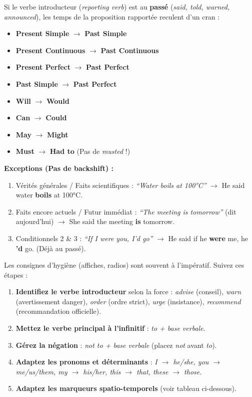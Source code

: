 \documentclass[11pt]{article}
\newcommand{\cle}[1]{{\popxbold\color{popdark}#1}}
\begin{document}
\begin{propriete}
Si le verbe introducteur (\emph{reporting verb}) est au \textbf{passé} (\emph{said, told, warned, announced}), les temps de la proposition rapportée reculent d'un cran :
\begin{itemize}
    \item \textbf{Present Simple} $\rightarrow$ \textbf{Past Simple}
    \item \textbf{Present Continuous} $\rightarrow$ \textbf{Past Continuous}
    \item \textbf{Present Perfect} $\rightarrow$ \textbf{Past Perfect}
    \item \textbf{Past Simple} $\rightarrow$ \textbf{Past Perfect}
    \item \textbf{Will} $\rightarrow$ \textbf{Would}
    \item \textbf{Can} $\rightarrow$ \textbf{Could}
    \item \textbf{May} $\rightarrow$ \textbf{Might}
    \item \textbf{Must} $\rightarrow$ \textbf{Had to} (Pas de \emph{musted} !)
\end{itemize}
\textbf{Exceptions (Pas de backshift) :}
\begin{enumerate}
    \item \cle{Vérités générales / Faits scientifiques} : \emph{``Water boils at 100°C''} $\rightarrow$ He said water \textbf{boils} at 100°C.
    \item \cle{Faits encore actuels / Futur immédiat} : \emph{``The meeting is tomorrow''} (dit aujourd'hui) $\rightarrow$ She said the meeting \textbf{is} tomorrow.
    \item \cle{Conditionnels 2 \& 3} : \emph{``If I were you, I'd go''} $\rightarrow$ He said if he \textbf{were} me, he \textbf{'d} go. (Déjà au passé).
\end{enumerate}
\end{propriete}

\begin{methode}
Les consignes d'hygiène (affiches, radios) sont souvent à l'impératif. Suivez ces étapes :
\begin{enumerate}
    \item \textbf{Identifiez le verbe introducteur} selon la force : \emph{advise} (conseil), \emph{warn} (avertissement danger), \emph{order} (ordre strict), \emph{urge} (insistance), \emph{recommend} (recommandation officielle).
    \item \textbf{Mettez le verbe principal à l'infinitif} : \emph{to + base verbale}.
    \item \textbf{Gérez la négation} : \emph{not to + base verbale} (placez \emph{not} avant \emph{to}).
    \item \textbf{Adaptez les pronoms et déterminants} : \emph{I $\rightarrow$ he/she, you $\rightarrow$ me/us/them, my $\rightarrow$ his/her, this $\rightarrow$ that, these $\rightarrow$ those}.
    \item \textbf{Adaptez les marqueurs spatio-temporels} (voir tableau ci-dessous).
\end{enumerate}
\end{methode}
\end{document}
